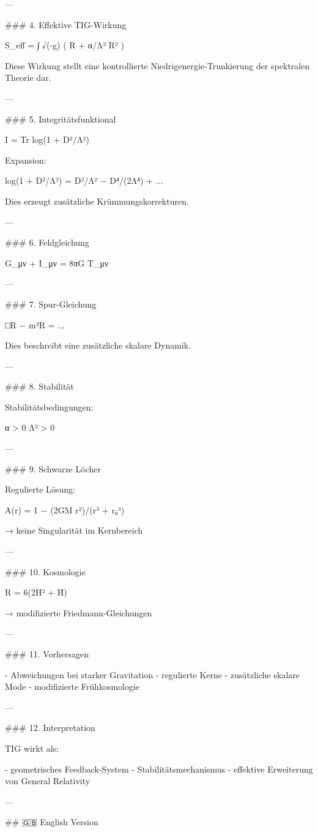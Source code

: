 ---

### 4. Effektive TIG-Wirkung

S_eff = ∫ √(-g) ( R + α/Λ² R² )

Diese Wirkung stellt eine kontrollierte Niedrigenergie-Trunkierung der spektralen Theorie dar.

---

### 5. Integritätsfunktional

I = Tr log(1 + D²/Λ²)

Expansion:

log(1 + D²/Λ²) = D²/Λ² − D⁴/(2Λ⁴) + ...

Dies erzeugt zusätzliche Krümmungskorrekturen.

---

### 6. Feldgleichung

G_{μν} + I_{μν} = 8πG T_{μν}

---

### 7. Spur-Gleichung

□R − m²R = ...

Dies beschreibt eine zusätzliche skalare Dynamik.

---

### 8. Stabilität

Stabilitätsbedingungen:

α > 0  
Λ² > 0  

---

### 9. Schwarze Löcher

Regulierte Lösung:

A(r) = 1 − (2GM r²)/(r³ + r₀³)

→ keine Singularität im Kernbereich

---

### 10. Kosmologie

R = 6(2H² + Ḣ)

→ modifizierte Friedmann-Gleichungen

---

### 11. Vorhersagen

- Abweichungen bei starker Gravitation  
- regulierte Kerne  
- zusätzliche skalare Mode  
- modifizierte Frühkosmologie  

---

### 12. Interpretation

TIG wirkt als:

- geometrisches Feedback-System  
- Stabilitätsmechanismus  
- effektive Erweiterung von General Relativity  

---

## 🇬🇧 English Version

